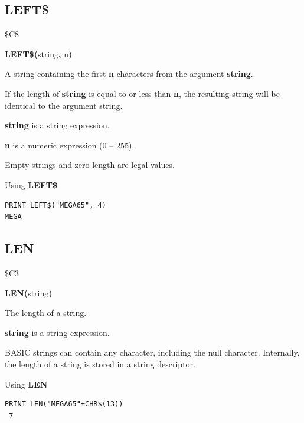 \subsection{LEFT\$}
\begin{description}[leftmargin=2cm,style=nextline]
\item [Token:]    \$C8

\item [Format:]   {\bf LEFT\$(}string{\bf,} n{\bf)}

\item [Returns:]  A string containing the first {\bf n} characters from the argument {\bf string}.

                  If the length of {\bf string} is equal to or less than {\bf n}, the resulting string will be identical to the argument string.

                  {\bf string} is a string expression.

                  {\bf n} is a numeric expression (0 -- 255).

\item [Remarks:]  Empty strings and zero length are legal values.

\item [Example:]  Using {\bf LEFT\$}

\begin{tcolorbox}[colback=black,coltext=white]
\verbatimfont{\codefont}
\begin{verbatim}
PRINT LEFT$("MEGA65", 4)
MEGA
\end{verbatim}
\end{tcolorbox}
\end{description}


\newpage
\subsection{LEN}
\begin{description}[leftmargin=2cm,style=nextline]
\item [Token:]    \$C3

\item [Format:]   {\bf LEN(}string{\bf)}

\item [Returns:]  The length of a string.

                  {\bf string} is a string expression.

\item [Remarks:]  BASIC strings can contain any character, including the null character. Internally, the length of a string is stored in a string descriptor.

\item [Example:]  Using {\bf LEN}

\begin{tcolorbox}[colback=black,coltext=white]
\verbatimfont{\codefont}
\begin{verbatim}
PRINT LEN("MEGA65"+CHR$(13))
 7
\end{verbatim}
\end{tcolorbox}
\end{description}

